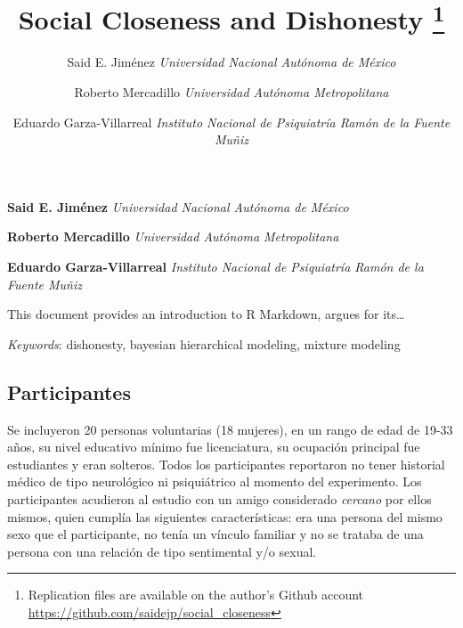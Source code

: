 \documentclass[12pt,]{article}
\title{Social Closeness and Dishonesty \thanks{Replication files are available on the author's Github account
\url{https://github.com/saidejp/social_closeness}}  }
\author{\Large Said E. Jiménez\vspace{0.05in} \newline\normalsize\emph{Universidad Nacional Autónoma de México}   \and \Large Roberto Mercadillo\vspace{0.05in} \newline\normalsize\emph{Universidad Autónoma Metropolitana}   \and \Large Eduardo Garza-Villarreal\vspace{0.05in} \newline\normalsize\emph{Instituto Nacional de Psiquiatría Ramón de la Fuente Muñiz}  }
\date{}
\newcommand*{\authorfont}{\fontfamily{phv}\selectfont}
\renewenvironment{abstract}
 {{%
    \setlength{\leftmargin}{0mm}
    \setlength{\rightmargin}{\leftmargin}%
  }%
  \relax}
 {\endlist}
\begin{document}
	
%

{%
\setlength{\parindent}{0pt}
\thispagestyle{plain}
{\fontsize{18}{20}\selectfont\raggedright 
\maketitle  %

}

{
   \vskip 13.5pt\relax \normalsize\fontsize{11}{12} 
\textbf{\authorfont Said E. Jiménez} \hskip 15pt \emph{\small Universidad Nacional Autónoma de México}   \par \textbf{\authorfont Roberto Mercadillo} \hskip 15pt \emph{\small Universidad Autónoma Metropolitana}   \par \textbf{\authorfont Eduardo Garza-Villarreal} \hskip 15pt \emph{\small Instituto Nacional de Psiquiatría Ramón de la Fuente Muñiz}   

}

}








\begin{abstract}

    \hbox{\vrule height .2pt width 39.14pc}

    \vskip 8.5pt %

\noindent This document provides an introduction to R Markdown, argues for
its\ldots{}


\vskip 8.5pt \noindent \emph{Keywords}: dishonesty, bayesian hierarchical modeling, mixture modeling \par

    \hbox{\vrule height .2pt width 39.14pc}



\end{abstract}


\vskip 6.5pt


\noindent  \subsection{Participantes}\label{participantes}

Se incluyeron 20 personas voluntarias (18 mujeres), en un rango de edad
de 19-33 años, su nivel educativo mínimo fue licenciatura, su ocupación
principal fue estudiantes y eran solteros. Todos los participantes
reportaron no tener historial médico de tipo neurológico ni psiquiátrico
al momento del experimento. Los participantes acudieron al estudio con
un amigo considerado \emph{cercano} por ellos mismos, quien cumplía las
siguientes características: era una persona del mismo sexo que el
participante, no tenía un vínculo familiar y no se trataba de una
persona con una relación de tipo sentimental y/o sexual.
\end{document}
